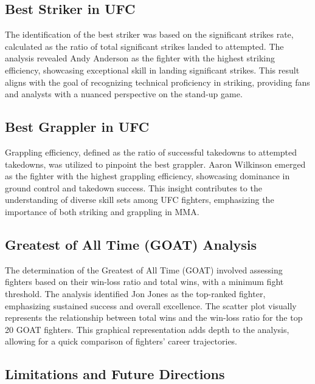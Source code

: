 \documentclass[
  man,floatsintext]{apa6}
\begin{document}
\hypertarget{best-striker-in-ufc}{%
\subsection{Best Striker in UFC}\label{best-striker-in-ufc}}

The identification of the best striker was based on the significant strikes rate, calculated as the ratio of total significant strikes landed to attempted. The analysis revealed Andy Anderson as the fighter with the highest striking efficiency, showcasing exceptional skill in landing significant strikes. This result aligns with the goal of recognizing technical proficiency in striking, providing fans and analysts with a nuanced perspective on the stand-up game.

\hypertarget{best-grappler-in-ufc}{%
\subsection{Best Grappler in UFC}\label{best-grappler-in-ufc}}

Grappling efficiency, defined as the ratio of successful takedowns to attempted takedowns, was utilized to pinpoint the best grappler. Aaron Wilkinson emerged as the fighter with the highest grappling efficiency, showcasing dominance in ground control and takedown success. This insight contributes to the understanding of diverse skill sets among UFC fighters, emphasizing the importance of both striking and grappling in MMA.

\hypertarget{greatest-of-all-time-goat-analysis}{%
\subsection{Greatest of All Time (GOAT) Analysis}\label{greatest-of-all-time-goat-analysis}}

The determination of the Greatest of All Time (GOAT) involved assessing fighters based on their win-loss ratio and total wins, with a minimum fight threshold. The analysis identified Jon Jones as the top-ranked fighter, emphasizing sustained success and overall excellence. The scatter plot visually represents the relationship between total wins and the win-loss ratio for the top 20 GOAT fighters. This graphical representation adds depth to the analysis, allowing for a quick comparison of fighters' career trajectories.

\hypertarget{limitations-and-future-directions}{%
\subsection{Limitations and Future Directions}\label{limitations-and-future-directions}}
\end{document}
